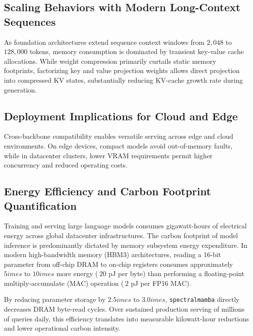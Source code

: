 \subsection{Scaling Behaviors with Modern Long-Context Sequences}
As foundation architectures extend sequence context windows from $2{,}048$ to $128{,}000$ tokens, memory consumption is dominated by transient key-value cache allocations. While weight compression primarily curtails static memory footprints, factorizing key and value projection weights allows direct projection into compressed KV states, substantially reducing KV-cache growth rate during generation.

\subsection{Deployment Implications for Cloud and Edge}
Cross-backbone compatibility enables versatile serving across edge and cloud environments. On edge devices, compact models avoid out-of-memory faults, while in datacenter clusters, lower VRAM requirements permit higher concurrency and reduced operating costs.

\subsection{Energy Efficiency and Carbon Footprint Quantification}
Training and serving large language models consumes gigawatt-hours of electrical energy across global datacenter infrastructures. The carbon footprint of model inference is predominantly dictated by memory subsystem energy expenditure. In modern high-bandwidth memory (HBM3) architectures, reading a 16-bit parameter from off-chip DRAM to on-chip registers consumes approximately $5	imes$ to $10	imes$ more energy ($~20$ pJ per byte) than performing a floating-point multiply-accumulate (MAC) operation ($~2$ pJ per FP16 MAC).

By reducing parameter storage by $2.5	imes$ to $3.0	imes$, \texttt{spectralmamba} directly decreases DRAM byte-read cycles. Over sustained production serving of millions of queries daily, this efficiency translates into measurable kilowatt-hour reductions and lower operational carbon intensity.

